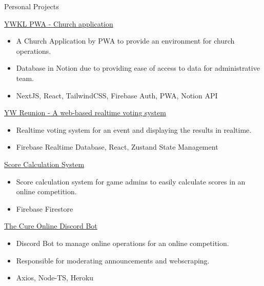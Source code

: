 \documentclass{article}
\newlength{\tabin}
\newlength{\secsep}
\newcommand{\lineunder}{\vspace*{-8pt} \\ \hspace*{-6pt} \hrulefill \\ \vspace*{-15pt}}
\newenvironment{tabbedsection}[1]{
  \begin{list}{}{
      \setlength{\itemsep}{0pt}
      \setlength{\labelsep}{0pt}
      \setlength{\labelwidth}{0pt}
      \setlength{\leftmargin}{\tabin}
      \setlength{\rightmargin}{\tabin}
      \setlength{\listparindent}{0pt}
      \setlength{\parsep}{0pt}
      \setlength{\parskip}{0pt}
      \setlength{\partopsep}{0pt}
      \setlength{\topsep}{#1}
    }
  \item[]
}{\end{list}}
\newenvironment{resume_section}[1]{
  \filbreak
  \vspace{2\secsep}
  \textsc{\large#1}
  \lineunder
  \begin{tabbedsection}{\secsep}
}{\end{tabbedsection}}
\newenvironment{resume_subsection}[2][]{
  \textbf{#2} \hfill {\footnotesize #1} \hspace{2em}
  \begin{tabbedsection}{0.5\secsep}
}{\end{tabbedsection}}
\newenvironment{subitems}{
  \renewcommand{\labelitemi}{-}
  \begin{itemize}
      \setlength{\labelsep}{1em}
}{\end{itemize}}
\begin{document}
\begin{resume_section}{Personal Projects}
  \vspace{\baselineskip}

  \begin{resume_subsection}[(August 2021)]{\href{https://github.com/etcasual/fgacycyw}{YWKL PWA - Church application}}
    \begin{subitems}
      \item A Church Application by PWA to provide an environment for church operations.
      \item Database in Notion due to providing ease of access to data for administrative team.
      \item NextJS, React, TailwindCSS, Firebase Auth, PWA, Notion API
    \end{subitems}
  \end{resume_subsection}

  \vspace{\baselineskip}

  \begin{resume_subsection}[(February 2022)]{\href{https://github.com/etcasual/ywreunion}{YW Reunion - A web-based realtime voting system}}
    \begin{subitems}
      \item Realtime voting system for an event and displaying the results in realtime.
      \item Firebase Realtime Database, React, Zustand State Management
    \end{subitems}
  \end{resume_subsection}

  \vspace{\baselineskip}

  \begin{resume_subsection}[(July 2021)]{\href{https://github.com/etcasual/stumble-guys-cal}{Score Calculation System}}
    \begin{subitems}
      \item Score calculation system for game admins to easily calculate scores in an online competition.
      \item Firebase Firestore
    \end{subitems}
  \end{resume_subsection}

  \vspace{\baselineskip}

  \begin{resume_subsection}[(April 2021)]{\href{https://github.com/etcasual/the-cure-discord}{The Cure Online Discord Bot}}
    \begin{subitems}
      \item Discord Bot to manage online operations for an online competition.
      \item Responsible for moderating announcements and webscraping.
      \item Axios, Node-TS, Heroku
    \end{subitems}
  \end{resume_subsection}


\end{resume_section}
\end{document}
